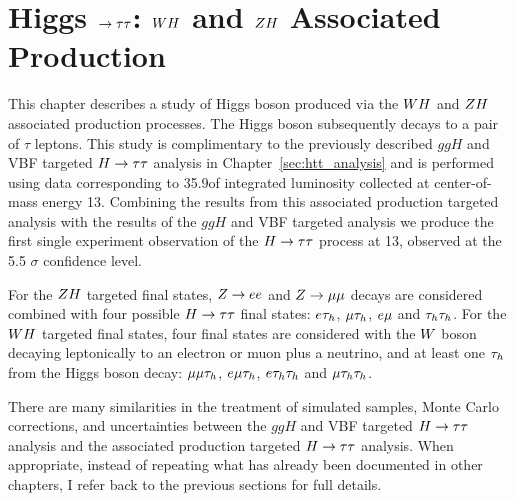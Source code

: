 \chapter{Higgs $\to \tau\tau$: $WH$ and $ZH$ Associated Production}
\label{sec:vh_analysis}

This chapter describes a study of Higgs boson produced via the $WH$ and
$ZH$ associated production processes. The Higgs boson subsequently
decays to a pair of $\tau$ leptons.
This study is complimentary to the previously described $ggH$ and VBF targeted
$H\to\tau\tau$ analysis in Chapter~\ref{sec:htt_analysis} and is performed 
using data corresponding to 35.9\fbinv of integrated luminosity 
collected at center-of-mass energy 13\TeV. Combining
the results from this associated production targeted analysis with the results 
of the $ggH$ and VBF targeted analysis
we produce the first single experiment observation of the $H\to\tau\tau$ process at 13\TeV, 
observed at the 5.5 $\sigma$ confidence level. 

For the $ZH$ targeted final states, $Z\rightarrow ee$
and $Z \to \mu\mu$ decays are considered combined with four possible $H\to\tau\tau$ 
final states: $e\tau_{h}$, $\mu\tau_{h}$,
$e\mu$ and $\tau_{h}\tau_{h}$. For the $WH$ targeted final states, four final states are considered with
the $W$ boson decaying leptonically to an electron or muon plus a neutrino, 
and at least one $\tau_{h}$ from the Higgs boson decay:
$\mu\mu\tau_{h}$, $e\mu\tau_{h}$, $e\tau_{h}\tau_{h}$ and $\mu\tau_{h}\tau_{h}$. 

There are many similarities in the treatment of simulated samples, Monte Carlo
corrections, and uncertainties between the $ggH$ and VBF targeted $H\to\tau\tau$ analysis
and the associated production targeted $H\to\tau\tau$ analysis. When appropriate, instead of repeating
what has already been documented in other chapters, I refer back to the previous sections for
full details.




